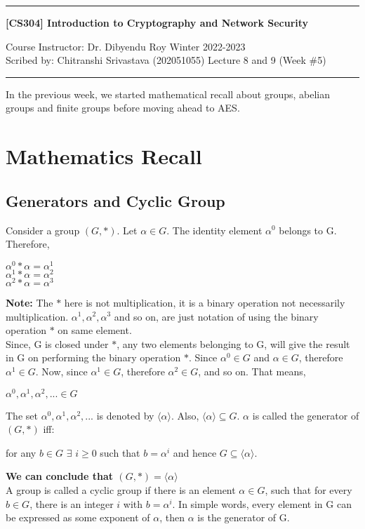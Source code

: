 \documentclass[11pt]{article}
\begin{document}
\noindent
\rule{\textwidth}{1pt}
\begin{center}
{\bf [CS304] Introduction to Cryptography and Network Security}
\end{center}
Course Instructor: Dr. Dibyendu Roy \hfill Winter 2022-2023\\
Scribed by: Chitranshi Srivastava (202051055) \hfill Lecture 8 and 9 (Week \#5)
\\
\rule{\textwidth}{1pt}
In the previous week, we started mathematical recall about groups, abelian groups and finite groups before moving ahead to AES.
\section{Mathematics Recall}

\subsection{Generators and Cyclic Group}
Consider a group $(G, *)$. Let $\alpha \in G$. The identity element $\alpha^0$ belongs to G. Therefore,
\begin{center}
    $\alpha^0 * \alpha = \alpha^1$\\
    \vspace{1mm}
    $\alpha^1 * \alpha = \alpha^2$\\
    \vspace{1mm}
    $\alpha^2 * \alpha = \alpha^3$\\
\end{center}
\textbf{Note: }The $*$ here is not multiplication, it is a binary operation not necessarily multiplication. $\alpha^1, \alpha^2, \alpha^3$ and so on, are just notation of using the binary operation $*$ on same element. \\
\vspace{5mm}
Since, G is closed under $*$, any two elements belonging to G, will give the result in G on performing the binary operation $*$. Since $\alpha^0 \in G$ and $\alpha \in G$, therefore $\alpha^1 \in G$. Now, since $\alpha^1 \in G$, therefore $\alpha^2 \in G$, and so on. That means,
\begin{center}
    $\alpha^0, \alpha^1, \alpha^2, ... \in G$
\end{center}
The set $\alpha^0, \alpha^1, \alpha^2, ...$ is denoted by $\langle \alpha \rangle$. Also, $\langle \alpha \rangle \subseteq G$. $\alpha$ is called the generator of $(G, *)$ iff:
\begin{center}
    for any $b \in G$ $\exists$ $i \geq 0$ such that $b = \alpha^i$ and hence $G \subseteq \langle \alpha \rangle $. 
\end{center}
\textbf{We can conclude that $(G,*) = \langle \alpha \rangle $}\\
A group is called a cyclic group if there is an element $\alpha \in G$, such that for every $b \in G$, there is an integer $i$ with $b = \alpha^i$. In simple words, every element in G can be expressed as some exponent of $\alpha$, then $\alpha$ is the generator of G.
\vspace{3mm}
\end{document}
